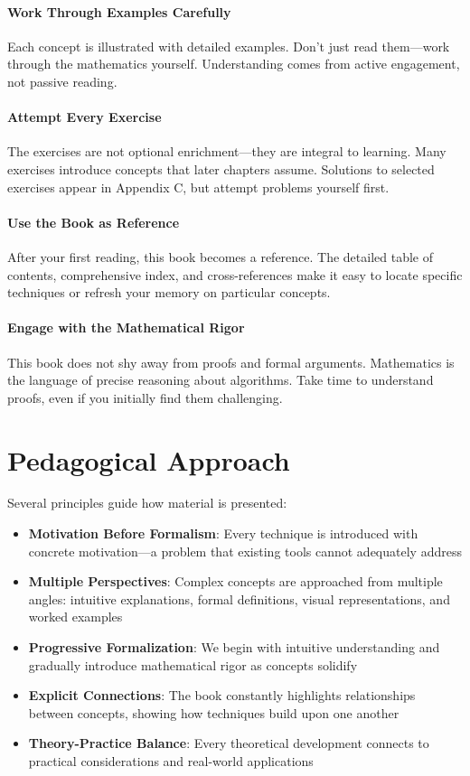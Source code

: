 \paragraph{Work Through Examples Carefully} Each concept is illustrated with detailed examples. Don't just read them—work through the mathematics yourself. Understanding comes from active engagement, not passive reading.

\paragraph{Attempt Every Exercise} The exercises are not optional enrichment—they are integral to learning. Many exercises introduce concepts that later chapters assume. Solutions to selected exercises appear in Appendix C, but attempt problems yourself first.

\paragraph{Use the Book as Reference} After your first reading, this book becomes a reference. The detailed table of contents, comprehensive index, and cross-references make it easy to locate specific techniques or refresh your memory on particular concepts.

\paragraph{Engage with the Mathematical Rigor} This book does not shy away from proofs and formal arguments. Mathematics is the language of precise reasoning about algorithms. Take time to understand proofs, even if you initially find them challenging.

\section*{Pedagogical Approach}

Several principles guide how material is presented:

\begin{itemize}
    \item \textbf{Motivation Before Formalism}: Every technique is introduced with concrete motivation—a problem that existing tools cannot adequately address
    \item \textbf{Multiple Perspectives}: Complex concepts are approached from multiple angles: intuitive explanations, formal definitions, visual representations, and worked examples
    \item \textbf{Progressive Formalization}: We begin with intuitive understanding and gradually introduce mathematical rigor as concepts solidify
    \item \textbf{Explicit Connections}: The book constantly highlights relationships between concepts, showing how techniques build upon one another
    \item \textbf{Theory-Practice Balance}: Every theoretical development connects to practical considerations and real-world applications
\end{itemize}

